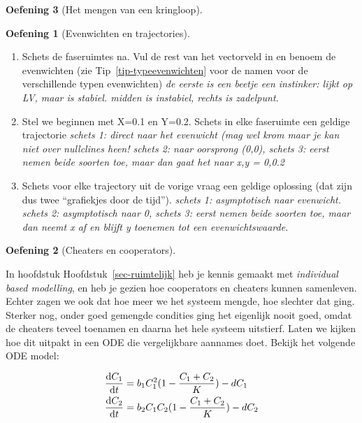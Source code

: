 \documentclass[
  a4paper,
]{scrbook}
\providecommand{\tightlist}{%
  \setlength{\itemsep}{0pt}\setlength{\parskip}{0pt}}\usepackage{longtable,booktabs,array}
\theoremstyle{definition}
\newtheorem{exercise}{Oefening}[chapter]
\theoremstyle{remark}
\begin{document}
\begin{exercise}[Het mengen van een
kringloop]
\begin{exercise}[Evenwichten en
trajectories]
\begin{enumerate}
\def\labelenumi{\alph{enumi}.}
\tightlist
\item
  Schets de faseruimtes na. Vul de rest van het vectorveld in en benoem
  de evenwichten (zie Tip~\ref{tip-typeevenwichten} voor de namen voor
  de verschillende typen evenwichten) \emph{de eerste is een beetje een
  instinker: lijkt op LV, maar is stabiel. midden is instabiel, rechts
  is zadelpunt.}
\item
  Stel we beginnen met X=0.1 en Y=0.2. Schets in elke faseruimte een
  geldige trajectorie \emph{schets 1: direct naar het evenwicht (mag wel
  krom maar je kan niet over nullclines heen! schets 2: naar oorsprong
  (0,0), schets 3: eerst nemen beide soorten toe, maar dan gaat het naar
  x,y = 0,0.2 }
\item
  Schets voor elke trajectory uit de vorige vraag een geldige oplossing
  (dat zijn dus twee ``grafiekjes door de tijd''). \emph{schets 1:
  asymptotisch naar evenwicht. schets 2: asymptotisch naar 0, schets 3:
  eerst nemen beide soorten toe, maar dan neemt x af en blijft y
  toenemen tot een evenwichtswaarde.}
\end{enumerate}

\end{exercise}

\begin{exercise}[Cheaters en
cooperators]\protect\hypertarget{exr-cheatandcoop}{}\label{exr-cheatandcoop}

In hoofdstuk Hoofdstuk~\ref{sec-ruimtelijk} heb je kennis gemaakt met
\emph{individual based modelling}, en heb je gezien hoe cooperators en
cheaters kunnen samenleven. Echter zagen we ook dat hoe meer we het
systeem mengde, hoe slechter dat ging. Sterker nog, onder goed gemengde
condities ging het eigenlijk nooit goed, omdat de cheaters teveel
toenamen en daarna het hele systeem uitstierf. Laten we kijken hoe dit
uitpakt in een ODE die vergelijkbare aannames doet. Bekijk het volgende
ODE model:

\begin{align*}
\mathchoice{\frac{\mathrm{d}C_1}
{\mathrm{d}t}}{\mathrm{d}C_1/\mathrm{d}t}
{\mathrm{d}C_1/\mathrm{d}t}
{\mathrm{d}C_1/\mathrm{d}t} &= b_1C_1^2(1-\frac{C_1+C_2}{K}) - dC_1\\
\mathchoice{\frac{\mathrm{d}C_2}
{\mathrm{d}t}}{\mathrm{d}C_2/\mathrm{d}t}
{\mathrm{d}C_2/\mathrm{d}t}
{\mathrm{d}C_2/\mathrm{d}t} &= b_2C_1C_2(1-\frac{C_1+C_2}{K}) - dC_2
\end{align*}


\end{exercise}
\end{exercise}
\end{document}
